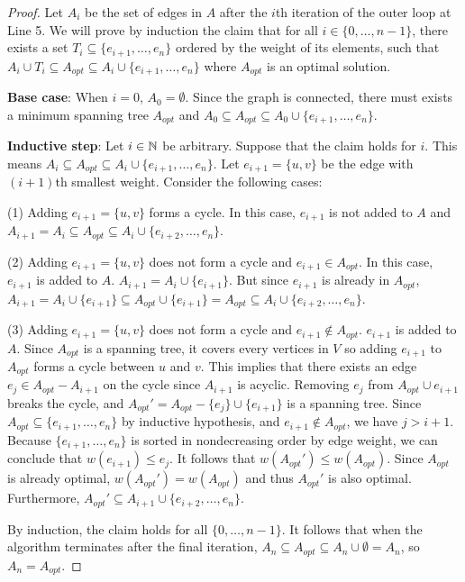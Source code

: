 \begin{proof}
    Let $A_i$ be the set of edges in $A$ after the $i$th iteration of the outer loop at Line 5. We will prove by induction the claim that for all $i \in \{0,\ldots,n-1\}$, there exists a set $T_i \subseteq \{e_{i+1},\ldots,e_n\}$ ordered by the weight of its elements, such that $A_i \cup T_i \subseteq A_{opt} \subseteq A_i \cup \{e_{i+1},\ldots,e_n\}$ where $A_{opt}$ is an optimal solution.

    \textbf{Base case}: When $i = 0$, $A_0 = \emptyset$. Since the graph is connected, there must exists a minimum spanning tree $A_{opt}$ and $A_0 \subseteq A_{opt} \subseteq A_0 \cup \{e_{i+1},\ldots,e_n\}$.

    \textbf{Inductive step}: Let $i \in \mathbb{N}$ be arbitrary. Suppose that the claim holds for $i$. This means $A_i \subseteq A_{opt} \subseteq A_i \cup \{e_{i+1},\ldots, e_n\}$. Let $e_{i+1} = \{u,v\}$ be the edge with $(i+1)$th smallest weight. Consider the following cases:

    (1) Adding $e_{i+1} = \{u,v\}$ forms a cycle. In this case, $e_{i+1}$ is not added to $A$ and $A_{i+1} = A_{i} \subseteq A_{opt} \subseteq A_i \cup \{e_{i+2},\ldots, e_n\}$.

    (2) Adding $e_{i+1} = \{u,v\}$ does not form a cycle and $e_{i+1} \in A_{opt}$. In this case, $e_{i+1}$ is added to $A$. $A_{i+1} = A_i \cup \{e_{i+1}\}$. But since $e_{i+1}$ is already in $A_{opt}$, $A_{i+1} = A_i \cup \{e_{i+1}\} \subseteq A_{opt} \cup \{e_{i+1}\} = A_{opt} \subseteq A_i \cup \{e_{i+2},\ldots,e_n\}$.

    (3) Adding $e_{i+1} = \{u,v\}$ does not form a cycle and $e_{i+1} \not\in A_{opt}$. $e_{i+1}$ is added to $A$. Since $A_{opt}$ is a spanning tree, it covers every vertices in $V$ so adding $e_{i+1}$ to $A_{opt}$ forms a cycle between $u$ and $v$. This implies that there exists an edge $e_j \in A_{opt} - A_{i+1}$ on the cycle since $A_{i+1}$ is acyclic. Removing $e_j$ from $A_{opt} \cup e_{i+1}$ breaks the cycle, and $A_{opt}' = A_{opt} - \{e_j\} \cup \{e_{i+1}\}$ is a spanning tree. Since $A_{opt} \subseteq \{e_{i+1},\ldots,e_n\}$ by inductive hypothesis, and $e_{i+1} \not\in A_{opt}$, we have $j > i+1$. Because $\{e_{i+1},\ldots,e_n\}$ is sorted in nondecreasing order by edge weight, we can conclude that $w(e_{i+1}) \leq e_j$. It follows that $w(A_{opt}') \leq w(A_{opt})$. Since $A_{opt}$ is already optimal, $w(A_{opt}') = w(A_{opt})$ and thus $A_{opt}'$ is also optimal. Furthermore, $A_{opt}' \subseteq A_{i+1} \cup \{e_{i+2},\ldots,e_n\}$.

    By induction, the claim holds for all $\{0,\ldots,n-1\}$. It follows that when the algorithm terminates after the final iteration, $A_{n} \subseteq A_{opt} \subseteq A_n \cup \emptyset = A_n$, so $A_n = A_{opt}$.
\end{proof}

